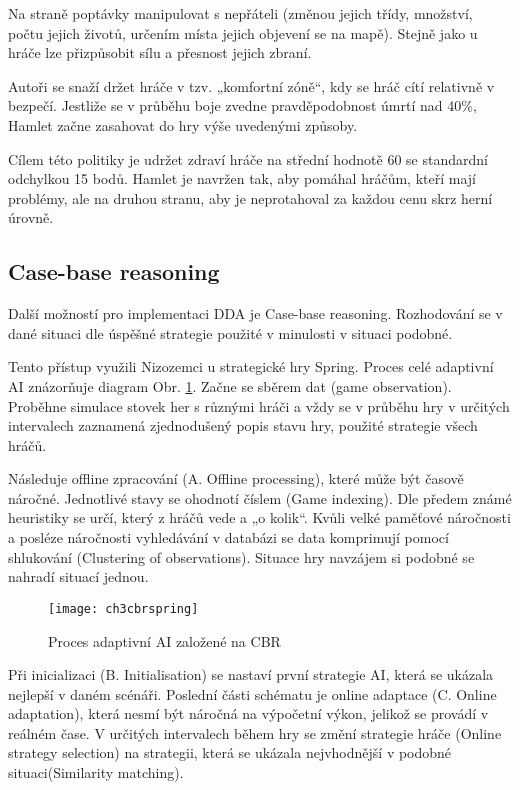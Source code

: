 Na straně poptávky manipulovat s nepřáteli (změnou jejich třídy, množství, počtu jejich životů, určením místa jejich objevení se na mapě). Stejně jako u hráče lze přizpůsobit sílu a přesnost jejich zbraní.

Autoři se snaží držet hráče v tzv. „komfortní zóně“, kdy se hráč cítí relativně v bezpečí. Jestliže se v průběhu boje zvedne pravděpodobnost úmrtí nad 40\%, Hamlet začne zasahovat do hry výše uvedenými způsoby.

Cílem této politiky je udržet zdraví hráče na střední hodnotě 60 se standardní odchylkou 15 bodů. Hamlet je navržen tak, aby pomáhal hráčům, kteří mají problémy, ale na druhou stranu, aby je neprotahoval za každou cenu skrz herní úrovně.

\subsection{Case-base reasoning} \label{sec:CBR}

Další možností pro implementaci DDA je Case-base reasoning. Rozhodování se v dané situaci dle úspěšné strategie použité v minulosti v situaci podobné.

Tento přístup využili Nizozemci u strategické hry Spring. \cite{21cbr} Proces celé adaptivní AI znázorňuje diagram Obr. \ref{fig:ch3cbrspring}.
Začne se sběrem dat (game observation). Proběhne simulace stovek her s různými hráči a vždy se v průběhu hry v určitých intervalech zaznamená zjednodušený popis stavu hry, použité strategie všech hráčů. 

Následuje offline zpracování (A. Offline processing), které může být časově náročné. Jednotlivé stavy se ohodnotí číslem (Game indexing). Dle předem známé heuristiky se určí, který z hráčů vede a „o kolik“. Kvůli velké paměťové náročnosti a posléze náročnosti vyhledávání v databázi se data komprimují pomocí shlukování (Clustering of observations). Situace hry navzájem si podobné se nahradí situací jednou.
 
\begin{figure}
  \centering
  \texttt{[image: ch3cbrspring]}
	\caption{Proces adaptivní AI založené na CBR \cite{21cbr}}
	\label{fig:ch3cbrspring}
\end{figure}

Při inicializaci (B. Initialisation) se nastaví první strategie AI, která se ukázala nejlepší v daném scénáři. Poslední části schématu je online adaptace (C. Online adaptation), která nesmí být náročná na výpočetní výkon, jelikož se provádí v reálném čase. V určitých intervalech během hry se změní strategie hráče (Online strategy selection) na strategii, která se ukázala nejvhodnější v podobné situaci(Similarity matching).

